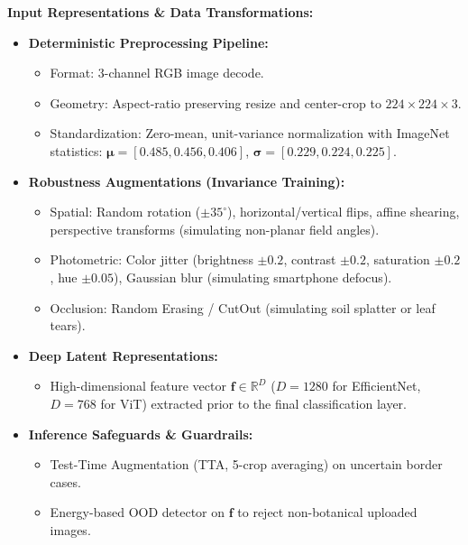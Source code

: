 \documentclass[8pt]{article}
\begin{document}
\begin{minipage}[t]{0.327\linewidth}%
  \begin{tcolorbox}[
    canvasbox,
    colback=bgFeatures,
    colframe=headFeatures,
    title={5. FEATURES \& PREPROCESSING},
    boxed title style={colback=headFeatures},
    height=68mm
  ]
  \fontsize{7.2pt}{8.8pt}\selectfont
  \textbf{Input Representations \& Data Transformations:}
  \vspace{1mm}
  \begin{itemize}
    \item \textbf{Deterministic Preprocessing Pipeline:}
      \begin{itemize}
        \item Format: 3-channel RGB image decode.
        \item Geometry: Aspect-ratio preserving resize and center-crop to $224 \times 224 \times 3$.
        \item Standardization: Zero-mean, unit-variance normalization with ImageNet statistics: $\boldsymbol{\mu} = [0.485, 0.456, 0.406]$, $\boldsymbol{\sigma} = [0.229, 0.224, 0.225]$.
      \end{itemize}
    \item \textbf{Robustness Augmentations (Invariance Training):}
      \begin{itemize}
        \item Spatial: Random rotation ($\pm 35^\circ$), horizontal/vertical flips, affine shearing, perspective transforms (simulating non-planar field angles).
        \item Photometric: Color jitter (brightness $\pm 0.2$, contrast $\pm 0.2$, saturation $\pm 0.2$, hue $\pm 0.05$), Gaussian blur (simulating smartphone defocus).
        \item Occlusion: Random Erasing / CutOut (simulating soil splatter or leaf tears).
      \end{itemize}
    \item \textbf{Deep Latent Representations:}
      \begin{itemize}
        \item High-dimensional feature vector $\mathbf{f} \in \mathbb{R}^{D}$ ($D=1280$ for EfficientNet, $D=768$ for ViT) extracted prior to the final classification layer.
      \end{itemize}
    \item \textbf{Inference Safeguards \& Guardrails:}
      \begin{itemize}
        \item Test-Time Augmentation (TTA, 5-crop averaging) on uncertain border cases.
        \item Energy-based OOD detector on $\mathbf{f}$ to reject non-botanical uploaded images.
      \end{itemize}
  \end{itemize}
  \end{tcolorbox}%
\end{minipage}\hfill%
\end{document}
